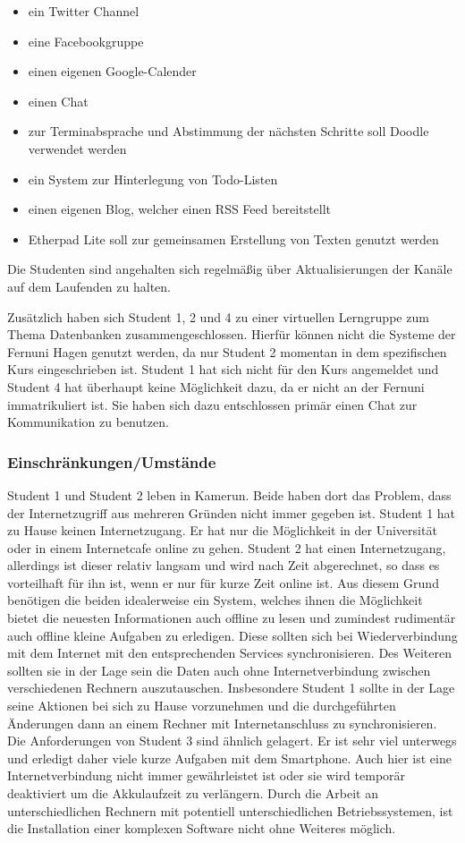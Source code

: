 \begin{itemize}
 \item ein Twitter Channel
 \item eine Facebookgruppe
 \item einen eigenen Google-Calender
 \item einen Chat
 \item zur Terminabsprache und Abstimmung der nächsten Schritte soll Doodle verwendet werden
 \item ein System zur Hinterlegung von Todo-Listen
 \item einen eigenen Blog, welcher einen RSS Feed bereitstellt 
 \item Etherpad Lite soll zur gemeinsamen Erstellung von Texten genutzt werden
\end{itemize}

Die Studenten sind angehalten sich regelmäßig über Aktualisierungen der Kanäle auf dem Laufenden zu halten.

Zusätzlich haben sich Student 1, 2 und 4 zu einer virtuellen Lerngruppe zum Thema Datenbanken zusammengeschlossen. Hierfür können nicht die Systeme der Fernuni Hagen genutzt werden, da nur Student 2 momentan in dem spezifischen Kurs eingeschrieben ist. Student 1 hat sich nicht für den Kurs angemeldet und Student 4 hat überhaupt keine Möglichkeit dazu, da er nicht an der Fernuni immatrikuliert ist. Sie haben sich dazu entschlossen primär einen Chat zur Kommunikation zu benutzen.

\subsubsection{Einschränkungen/Umstände}
Student 1 und Student 2 leben in Kamerun. Beide haben dort das Problem, dass der Internetzugriff aus mehreren Gründen nicht immer gegeben ist. Student 1 hat zu Hause keinen Internetzugang. Er hat nur die Möglichkeit in der Universität oder in einem Internetcafe online zu gehen. Student 2 hat einen Internetzugang, allerdings ist dieser relativ langsam und wird nach Zeit abgerechnet, so dass es vorteilhaft für ihn ist, wenn er nur für kurze Zeit online ist. Aus diesem Grund benötigen die beiden idealerweise ein System, welches ihnen die Möglichkeit bietet die neuesten Informationen auch offline zu lesen und zumindest rudimentär auch offline kleine Aufgaben zu erledigen. Diese sollten sich bei Wiederverbindung mit dem Internet mit den entsprechenden Services synchronisieren. Des Weiteren sollten sie in der Lage sein die Daten auch ohne Internetverbindung zwischen verschiedenen Rechnern auszutauschen. Insbesondere Student 1 sollte in der Lage seine Aktionen bei sich zu Hause vorzunehmen und die durchgeführten Änderungen dann an einem Rechner mit Internetanschluss zu synchronisieren. Die Anforderungen von Student 3 sind ähnlich gelagert. Er ist sehr viel unterwegs und erledigt daher viele kurze Aufgaben mit dem Smartphone. Auch hier ist eine Internetverbindung nicht immer gewährleistet ist oder sie wird temporär deaktiviert um die Akkulaufzeit zu verlängern. Durch die Arbeit an unterschiedlichen Rechnern mit potentiell unterschiedlichen Betriebssystemen, ist die Installation einer komplexen Software nicht ohne Weiteres möglich.

